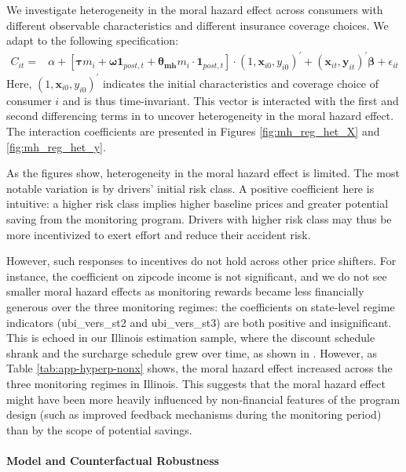 We investigate heterogeneity in the moral hazard effect across consumers with different observable characteristics and different insurance coverage choices. We adapt  to the following specification:
\begin{align}
C_{it}= &
\alpha+\left[ \mathbf{\tau} m_{i}+ \mathbf{\omega}\mathbf{1}_{post,t} +
\mathbf{\theta_{mh}} m_{i}\cdot\mathbf{1}_{post,t} \right] \cdot (1,\mathbf{x}_{i0},y_{i0})^\prime +
(\mathbf{x}_{it},\mathbf{y}_{it})^{\prime}\mathbf{\beta} + \epsilon_{it}\label{eq:mh_reg_het}
\end{align}
Here, $(1,\mathbf{x}_{i0},y_{i0})^\prime$ indicates the initial characteristics and coverage choice of consumer $i$ and is thus time-invariant. This vector is interacted with the first and second differencing terms in   to uncover heterogeneity in the moral hazard effect. The interaction coefficients are presented in Figures \ref{fig:mh_reg_het_X} and \ref{fig:mh_reg_het_y}.

As the figures show, heterogeneity in the moral hazard effect is limited. The most notable variation is by drivers' initial risk class.
A positive coefficient here is intuitive: a higher risk class implies higher baseline prices and greater potential saving from the monitoring program. Drivers with higher risk class may thus be more incentivized to exert effort and reduce their accident risk.

However, such responses to incentives do not hold across other price shifters. For instance, the coefficient on zipcode income is not significant, and we do not see smaller moral hazard effects as monitoring rewards became less financially generous over the three monitoring regimes: the coefficients on state-level regime indicators (ubi\_vers\_st2 and ubi\_vers\_st3) are both positive and insignificant. This is echoed in our Illinois estimation sample, where the discount schedule shrank and the surcharge schedule grew over time, as shown in . However, as Table \ref{tab:app-hyperp-nonx} shows, the moral hazard effect increased across the three monitoring regimes in Illinois. This suggests that the moral hazard effect might have been more heavily influenced by non-financial features of the program design (such as improved feedback mechanisms during the monitoring period) than by the scope of potential savings.

\paragraph{Model and Counterfactual Robustness}

